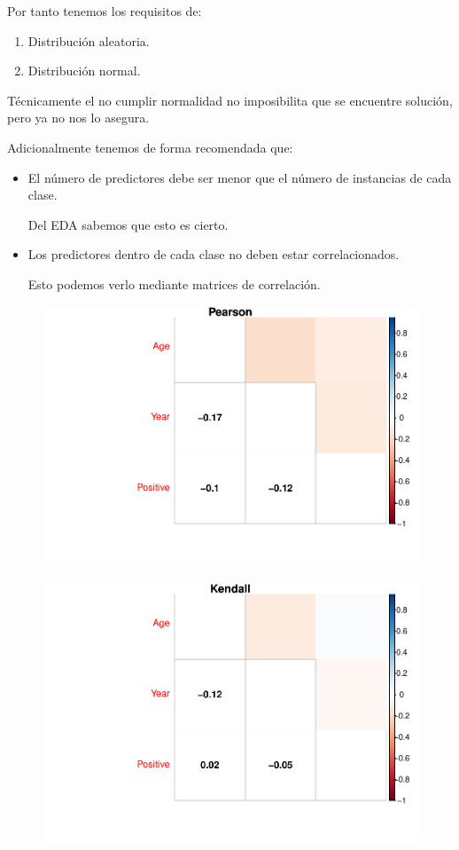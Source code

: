 Por tanto tenemos los requisitos de: 
\begin{enumerate}
    \item Distribución aleatoria.
    \item Distribución normal.
\end{enumerate}

Técnicamente el no cumplir normalidad no imposibilita que se encuentre solución, pero ya no nos lo asegura.

\vspace{\baselineskip}

Adicionalmente tenemos de forma recomendada que: 
\begin{itemize}
    \item El número de predictores debe ser menor que el número de instancias de cada clase. 
    
    Del EDA sabemos que esto es cierto.
    \item Los predictores dentro de cada clase no deben estar correlacionados.
    
    Esto podemos verlo mediante matrices de correlación.
\end{itemize}

\begin{figure}[H]\center\includegraphics[width=.9\linewidth]{img/Clasificacion_files/figure-latex/unnamed-chunk-27-1}\caption{}\end{figure}

\begin{figure}[H]\center\includegraphics[width=.9\linewidth]{img/Clasificacion_files/figure-latex/unnamed-chunk-27-2}\caption{}\end{figure}

